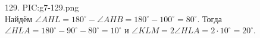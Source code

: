 129. {{PIC:g7-129.png}}\\
Найдём $\angle AHL=180^\circ-\angle AHB=180^\circ-100^\circ=80^\circ.$ Тогда $\angle HLA=180^\circ-90^\circ-80^\circ=10^\circ$ и $\angle KLM=2\angle HLA=2\cdot10^\circ=20^\circ.$\\
